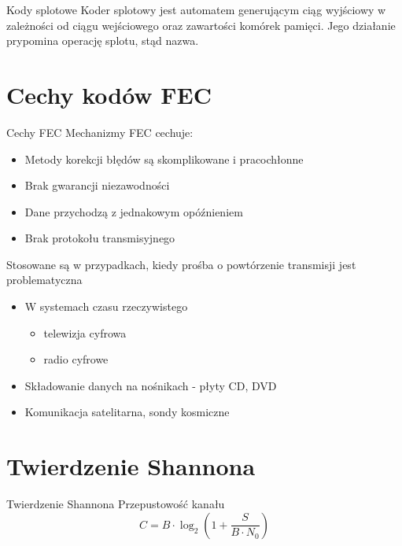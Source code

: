 \documentclass[12pt]{beamer}
\begin{document}
\begin{frame}{Kody splotowe}
Koder splotowy jest automatem generującym ciąg wyjściowy w zależności od ciągu wejściowego oraz zawartości komórek pamięci. Jego działanie prypomina operację splotu, stąd nazwa.
\end{frame}

\section{Cechy kodów FEC}
\begin{frame}{Cechy FEC}
Mechanizmy FEC cechuje:
\begin{itemize}
	\item Metody korekcji błędów są skomplikowane i pracochłonne
	\item Brak gwarancji niezawodności
	\item Dane przychodzą z jednakowym opóźnieniem
	\item Brak protokołu transmisyjnego
\end{itemize}
Stosowane są w przypadkach, kiedy prośba o powtórzenie transmisji jest problematyczna
\begin{itemize}
	\item W systemach czasu rzeczywistego
	\begin{itemize}
		\item telewizja cyfrowa
		\item radio cyfrowe		
	\end{itemize}
	\item Składowanie danych na nośnikach - płyty CD, DVD
	\item Komunikacja satelitarna, sondy kosmiczne
\end{itemize}
\end{frame}

\section{Twierdzenie Shannona}
\begin{frame}{Twierdzenie Shannona}
Przepustowość kanału
\begin{equation}
C=B\cdot\log_2(1+\frac{S}{B \cdot N_0})
\end{equation}
\end{frame}
\end{document}
